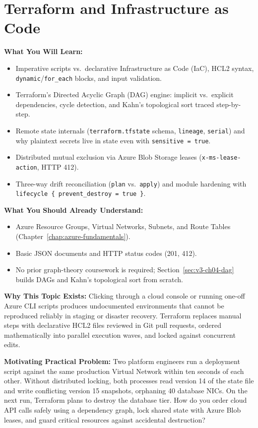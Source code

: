 \chapter{Terraform and Infrastructure as Code}
\label{chap:terraform}

\begin{chaptergoalsbox}
\textbf{What You Will Learn:}
\begin{itemize}[leftmargin=12pt]
  \item Imperative scripts vs.\ declarative Infrastructure as Code (IaC), HCL2 syntax, \texttt{dynamic}/\texttt{for\_each} blocks, and input validation.
  \item Terraform's Directed Acyclic Graph (DAG) engine: implicit vs.\ explicit dependencies, cycle detection, and Kahn's topological sort traced step-by-step.
  \item Remote state internals (\texttt{terraform.tfstate} schema, \texttt{lineage}, \texttt{serial}) and why plaintext secrets live in state even with \texttt{sensitive = true}.
  \item Distributed mutual exclusion via Azure Blob Storage leases (\texttt{x-ms-lease-action}, HTTP 412).
  \item Three-way drift reconciliation (\texttt{plan} vs.\ \texttt{apply}) and module hardening with \texttt{lifecycle \{ prevent\_destroy = true \}}.
\end{itemize}

\textbf{What You Should Already Understand:}
\begin{itemize}[leftmargin=12pt]
  \item Azure Resource Groups, Virtual Networks, Subnets, and Route Tables (Chapter~\ref{chap:azure-fundamentals}).
  \item Basic JSON documents and HTTP status codes (201, 412).
  \item No prior graph-theory coursework is required; Section~\ref{sec:v3-ch04-dag} builds DAGs and Kahn's topological sort from scratch.
\end{itemize}

\textbf{Why This Topic Exists:}
Clicking through a cloud console or running one-off Azure CLI scripts produces undocumented environments that cannot be reproduced reliably in staging or disaster recovery. Terraform replaces manual steps with declarative HCL2 files reviewed in Git pull requests, ordered mathematically into parallel execution waves, and locked against concurrent edits.

\textbf{Motivating Practical Problem:}
Two platform engineers run a deployment script against the same production Virtual Network within ten seconds of each other. Without distributed locking, both processes read version 14 of the state file and write conflicting version 15 snapshots, orphaning 40 database NICs. On the next run, Terraform plans to destroy the database tier. How do you order cloud API calls safely using a dependency graph, lock shared state with Azure Blob leases, and guard critical resources against accidental destruction?
\end{chaptergoalsbox}

